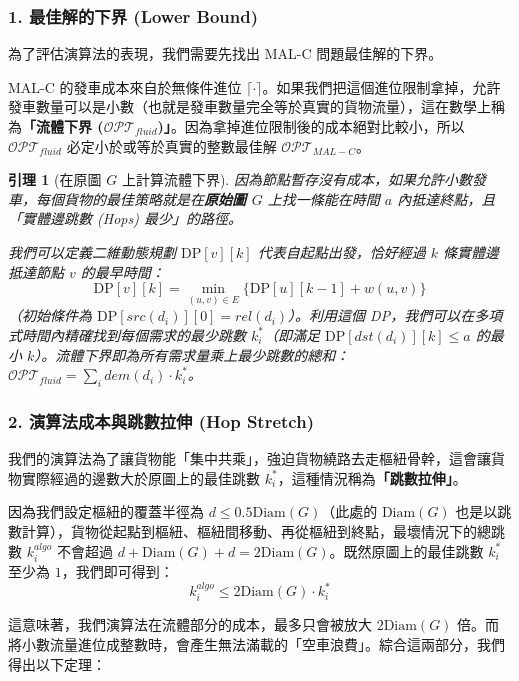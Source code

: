 \documentclass{article}
\newtheorem{lemma}{引理}
\begin{document}
\subsubsection*{1. 最佳解的下界 (Lower Bound)}

為了評估演算法的表現，我們需要先找出 MAL-C 問題最佳解的下界。

MAL-C 的發車成本來自於無條件進位 $\lceil \cdot \rceil$。如果我們把這個進位限制拿掉，允許發車數量可以是小數（也就是發車數量完全等於真實的貨物流量），這在數學上稱為\textbf{「流體下界 ($\mathcal{OPT}_{fluid}$)」}。因為拿掉進位限制後的成本絕對比較小，所以 $\mathcal{OPT}_{fluid}$ 必定小於或等於真實的整數最佳解 $\mathcal{OPT}_{MAL-C}$。

\begin{lemma}[在原圖 $G$ 上計算流體下界]
因為節點暫存沒有成本，如果允許小數發車，每個貨物的最佳策略就是在\textbf{原始圖 $G$} 上找一條能在時間 $a$ 內抵達終點，且「實體邊跳數 (Hops) 最少」的路徑。

我們可以定義二維動態規劃 $\text{DP}[v][k]$ 代表自起點出發，恰好經過 $k$ 條實體邊抵達節點 $v$ 的最早時間：
\begin{equation}
    \text{DP}[v][k] = \min_{(u,v) \in E} \{ \text{DP}[u][k-1] + w(u,v) \}
\end{equation}
（初始條件為 $\text{DP}[src(d_i)][0] = rel(d_i)$）。利用這個 DP，我們可以在多項式時間內精確找到每個需求的最少跳數 $k_i^*$（即滿足 $\text{DP}[dst(d_i)][k] \le a$ 的最小 $k$）。流體下界即為所有需求量乘上最少跳數的總和：$\mathcal{OPT}_{fluid} = \sum_{i} dem(d_i) \cdot k_i^*$。
\end{lemma}

\subsubsection*{2. 演算法成本與跳數拉伸 (Hop Stretch)}

我們的演算法為了讓貨物能「集中共乘」，強迫貨物繞路去走樞紐骨幹，這會讓貨物實際經過的邊數大於原圖上的最佳跳數 $k_i^*$，這種情況稱為\textbf{「跳數拉伸」}。

因為我們設定樞紐的覆蓋半徑為 $d \le 0.5\text{Diam}(G)$（此處的 $\text{Diam}(G)$ 也是以跳數計算），貨物從起點到樞紐、樞紐間移動、再從樞紐到終點，最壞情況下的總跳數 $k_i^{algo}$ 不會超過 $d + \text{Diam}(G) + d = 2\text{Diam}(G)$。既然原圖上的最佳跳數 $k_i^*$ 至少為 $1$，我們即可得到：
\begin{equation}
    k_i^{algo} \le 2\text{Diam}(G) \cdot k_i^*
\end{equation}

這意味著，我們演算法在流體部分的成本，最多只會被放大 $2\text{Diam}(G)$ 倍。而將小數流量進位成整數時，會產生無法滿載的「空車浪費」。綜合這兩部分，我們得出以下定理：
\end{document}
